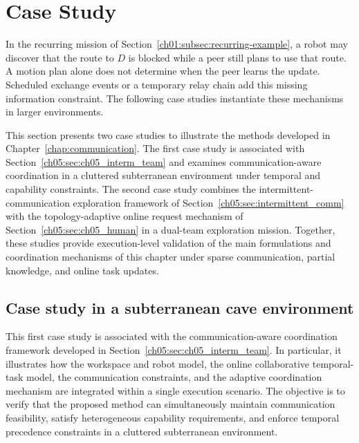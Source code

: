 \section{Case Study}
\label{sec:ch05_case_study}

\begin{revision}
In the recurring mission of
Section~\ref{ch01:subsec:recurring-example}, a robot may discover that
the route to $D$ is blocked while a peer still plans to use that route.
A motion plan alone does not determine when the peer learns the update.
Scheduled exchange events or a temporary relay chain add this missing
information constraint. The following case studies instantiate these
mechanisms in larger environments.
\end{revision}

This section presents two case studies to illustrate the methods
developed in Chapter~\ref{chap:communication}. The first case study is
associated with Section~\ref{ch05:sec:ch05_interm_team} and examines
communication-aware coordination in a cluttered subterranean
environment under temporal and capability constraints. The second case
study combines the intermittent-communication exploration framework of
Section~\ref{ch05:sec:intermittent_comm} with the topology-adaptive online
request mechanism of Section~\ref{ch05:sec:ch05_human} in a dual-team
exploration mission. Together, these studies provide execution-level
validation of the main formulations and coordination mechanisms of this
chapter under sparse communication, partial knowledge, and online task
updates.

\subsection{Case study in a subterranean cave environment}
\label{ch05:subsec:case_subterranean_cave}

This first case study is associated with the communication-aware
coordination framework developed in
Section~\ref{ch05:sec:ch05_interm_team}. In particular, it illustrates how
the workspace and robot model, the online collaborative
temporal-task model, the
communication constraints, and
the adaptive coordination mechanism are integrated within a
single execution scenario. The objective is to verify that the
proposed method can simultaneously maintain communication feasibility,
satisfy heterogeneous capability requirements, and enforce temporal
precedence constraints in a cluttered subterranean environment.

